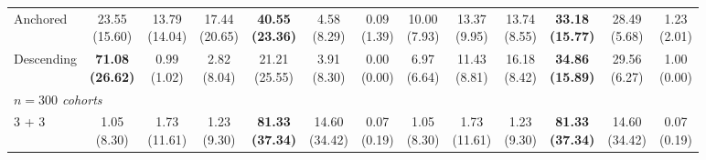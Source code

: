 {\begin{tabular}{l|cccccc|cccccc}
Anchored & \makecell{23.55 \\ (15.60)} & \makecell{13.79 \\ (14.04)} & \makecell{17.44 \\ (20.65)} & {\cellcolor[HTML]{C8E6C9}} \bfseries \makecell{40.55 \\ (23.36)} & \makecell{4.58 \\ (8.29)} & \makecell{0.09 \\ (1.39)} & \makecell{10.00 \\ (7.93)} & \makecell{13.37 \\ (9.95)} & \makecell{13.74 \\ (8.55)} & {\cellcolor[HTML]{C8E6C9}} \bfseries \makecell{33.18 \\ (15.77)} & \makecell{28.49 \\ (5.68)} & \makecell{1.23 \\ (2.01)} \\
Descending & \bfseries \makecell{71.08 \\ (26.62)} & \makecell{0.99 \\ (1.02)} & \makecell{2.82 \\ (8.04)} & {\cellcolor[HTML]{C8E6C9}} \makecell{21.21 \\ (25.55)} & \makecell{3.91 \\ (8.30)} & \makecell{0.00 \\ (0.00)} & \makecell{6.97 \\ (6.64)} & \makecell{11.43 \\ (8.81)} & \makecell{16.18 \\ (8.42)} & {\cellcolor[HTML]{C8E6C9}} \bfseries \makecell{34.86 \\ (15.89)} & \makecell{29.56 \\ (6.27)} & \makecell{1.00 \\ (0.00)} \\
\midrule
\multicolumn{13}{l}{\emph{$n = 300$ cohorts}} \\
3 + 3 & \makecell{1.05 \\ (8.30)} & \makecell{1.73 \\ (11.61)} & \makecell{1.23 \\ (9.30)} & {\cellcolor[HTML]{C8E6C9}} \bfseries \makecell{81.33 \\ (37.34)} & \makecell{14.60 \\ (34.42)} & \makecell{0.07 \\ (0.19)} & \makecell{1.05 \\ (8.30)} & \makecell{1.73 \\ (11.61)} & \makecell{1.23 \\ (9.30)} & {\cellcolor[HTML]{C8E6C9}} \bfseries \makecell{81.33 \\ (37.34)} & \makecell{14.60 \\ (34.42)} & \makecell{0.07 \\ (0.19)} \\

\end{tabular}}
